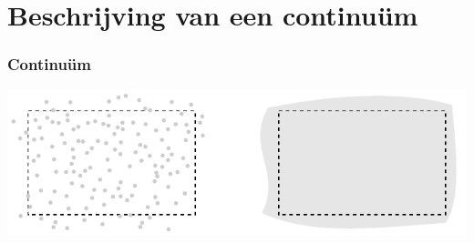 \documentclass[t]{beamer}
\subtitle{Basisbegrippen}
\begin{document}
	\frame{\titlepage}
	\section{Beschrijving van een continuüm}
		\begin{frame}
			\frametitle{Continuüm}
			\vspace{1cm}
			\center
			\includegraphics{../fig/basisbegrippen/Continuum}
  		\end{frame}
\end{document}
